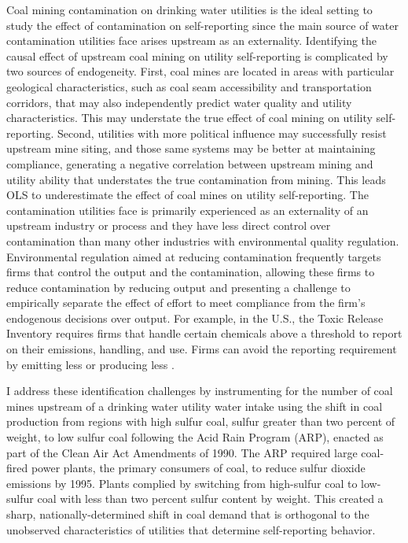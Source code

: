 \documentclass{article}
\begin{document}
Coal mining contamination on drinking water utilities is the ideal setting to study the effect of contamination on self-reporting since the main source of water contamination utilities face arises upstream as an externality. Identifying the causal effect of upstream coal mining on utility self-reporting is complicated by two sources of endogeneity. First, coal mines are located in areas with particular geological characteristics, such as coal seam accessibility and transportation corridors, that may also independently predict water quality and utility characteristics. This may understate the true effect of coal mining on utility self-reporting. Second, utilities with more political influence may successfully resist upstream mine siting, and those same systems may be better at maintaining compliance, generating a negative correlation between upstream mining and utility ability that understates the true contamination from mining. This leads OLS to underestimate the effect of coal mines on utility self-reporting. The contamination utilities face is primarily experienced as an externality of an upstream industry or process and they have less direct control over contamination than many other industries with environmental quality regulation. Environmental regulation aimed at reducing contamination frequently targets firms that control the output and the contamination, allowing these firms to reduce contamination by reducing output and presenting a challenge to empirically separate the effect of effort to meet compliance from the firm's endogenous decisions over output. For example, in the U.S., the Toxic Release Inventory requires firms that handle certain chemicals above a threshold to report on their emissions, handling, and use. Firms can avoid the reporting requirement by emitting less or producing less \parencite{zou2021unwatched, 10.1162/rest_a_01477}. 

I address these identification challenges by instrumenting for the number of coal mines upstream of a drinking water utility water intake using the shift in coal production from regions with high sulfur coal, sulfur greater than two percent of weight, to low sulfur coal following the Acid Rain Program (ARP), enacted as part of the Clean Air Act Amendments of 1990. The ARP required large coal-fired power plants, the primary consumers of coal, to reduce sulfur dioxide emissions by 1995. Plants complied by switching from high-sulfur coal to low-sulfur coal with less than two percent sulfur content by weight. This created a sharp, nationally-determined shift in coal demand that is orthogonal to the unobserved characteristics of utilities that determine self-reporting behavior.
\end{document}
